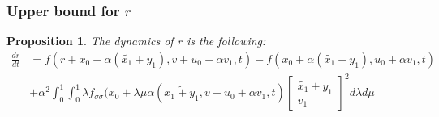 \documentclass[a4paper,10pt]{article}
\newtheorem{proposition}{Proposition}
\begin{document}
\subsubsection{Upper bound for $r$}
\begin{proposition}
    The dynamics of $r$ is the following:
    \begin{equation}
    		 \label{rdynsmics}
		\begin{split}
       \frac{dr}{dt}  & =  f(r+x_{0}+ \alpha ( \tilde{x_{1}} + y_{1}), v + u_{0} + \alpha v_{1}, t)
                    - f(x_{0}+ \alpha ( \tilde{x_{1}} + y_{1}), u_{0} + \alpha v_{1}, t) 
       \\
         &   + \alpha^{2} \int_{0}^{1} \int_{0}^{1}
		   \lambda f_{\sigma \sigma}(x_{0}+\lambda\mu\alpha(\tilde{x_{1}+y_{1}},
		       v + u_{0} + \alpha v_{1},t)
		       \left[
		       \begin{array}
		       {c}
		           \tilde{x_{1}} + y_{1}  \\
		           v_{1} 
		       \end{array}
		       \right]^{2} d \lambda d \mu
		\end{split}
\end{equation}
\end{proposition}
\end{document}
